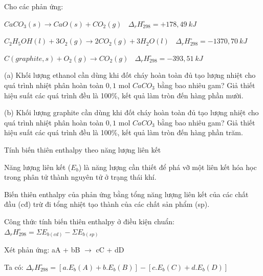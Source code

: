 \documentclass[Main.tex]{subfiles}
\begin{document}
	\begin{bt}
		Cho các phản ứng:
		
		$CaCO_3(s) \longrightarrow CaO(s) + CO_2(g) \ \ \ \ \Delta_r H_{298}^\circ = +178{,}49 \ kJ$
		
		$C_2H_5OH(l) + 3O_2(g) \longrightarrow 2CO_2(g) + 3H_2O(l) \ \ \ \ \Delta_r H_{298}^\circ = -1370{,}70 \ kJ$
		
		$C(graphite, s) + O_2(g) \longrightarrow CO_2(g) \ \ \ \ \Delta_r H_{298}^\circ = -393{,}51 \ kJ$
		
		(a) Khối lượng ethanol cần dùng khi đốt cháy hoàn toàn đủ tạo lượng nhiệt cho quá trình nhiệt phân hoàn toàn $0{,}1$ mol $CaCO_3$ bằng bao nhiêu gam? Giả thiết hiệu suất các quá trình đều là 100\%, kết quả làm tròn đến hàng phần mười.
		
		(b) Khối lượng graphite cần dùng khi đốt cháy hoàn toàn đủ tạo lượng nhiệt cho quá trình nhiệt phân hoàn toàn $0{,}1$ mol $CaCO_3$ bằng bao nhiêu gam? Giả thiết hiệu suất các quá trình đều là 100\%, kết quả làm tròn đến hàng phần trăm.
	\end{bt}
\begin{dang} {Tính biến thiên enthalpy theo năng lượng liên kết}
\end{dang}
\begin{phuongphap}
	\begin{cacbuoc}
		\item Năng lượng liên kết ($E_b$) là năng lượng cần thiết để phá vỡ một liên kết hóa học trong phân tử thành nguyên tử ở trạng thái khí.
		\item Biến thiên enthalpy của phản ứng bằng tổng năng lượng liên kết của các chất đầu (cđ) trừ đi tổng nhiệt tạo thành của các chất sản phẩm (sp).
		\item Công thức tính biến thiên enthalpy ở điều kiện chuẩn: $\Delta_r H_{298}^\circ = \Sigma E_{b(cd)} - \Sigma E_{b(sp)}$
		\item Xét phản ứng: aA + bB $\rightarrow$ cC + dD
		\item Ta có: $\Delta_r H_{298}^\circ = [a.E_b(A) + b.E_b(B)] - [c.E_b(C) + d.E_b(D)]$
	\end{cacbuoc}
\end{phuongphap}
\end{document}
